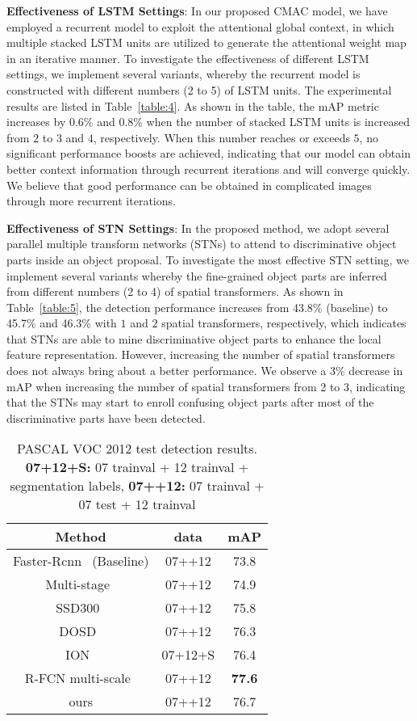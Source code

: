\documentclass[journal]{IEEEtran}
\begin{document}
\textbf{Effectiveness of LSTM Settings}: In our proposed CMAC model, we have employed a recurrent model to exploit the attentional global context, in which multiple stacked LSTM units are utilized to generate the attentional weight map in an iterative manner. To investigate the effectiveness of different LSTM settings, we implement several variants, whereby the recurrent model is constructed with different numbers (2 to 5) of LSTM units. The experimental results are listed in Table~\ref{table:4}. As shown in the table, the mAP metric increases by 0.6\% and 0.8\% when the number of stacked LSTM units is increased from $2$ to $3$ and $4$, respectively. When this number reaches or exceeds $5$, no significant performance boosts are achieved, indicating that our model can obtain better context information through recurrent iterations and will converge quickly. We believe that good performance can be obtained in complicated images through more recurrent iterations. 

\textbf{Effectiveness of STN Settings}: In the proposed method, we adopt several parallel multiple transform networks (STNs) to attend to discriminative object parts inside an object proposal. To investigate the most effective STN setting, we implement several variants whereby the fine-grained object parts are inferred from different numbers (2 to 4) of spatial transformers. As shown in Table~\ref{table:5}, the detection performance increases from 43.8\% (baseline) to 45.7\% and 46.3\% with $1$ and $2$ spatial transformers, respectively, which indicates that STNs are able to mine discriminative object parts to enhance the local feature representation. However, increasing the number of spatial transformers does not always bring about a better performance. We observe a 3\% decrease in mAP when increasing the number of spatial transformers from 2 to 3, indicating that the STNs may start to enroll confusing object parts after most of the discriminative parts have been detected.

\begin{table}[h] \centering
	\caption{\label{table:voc_2012}  PASCAL VOC 2012 test detection results. \textbf{07+12+S:} 07 trainval + 12 trainval + segmentation labels, \textbf{07++12:} 07
trainval + 07 test + 12 trainval}
	\begin{tabular}{c|c|c}
	\toprule
	\textbf{Method}&\textbf{data}&\textbf{mAP} \\
	\midrule
	Faster-Rcnn~\cite{ren2015faster} (Baseline) & 07++12  & 73.8 \\
	Multi-stage~\cite{li2017multi}     & 07++12  & 74.9 \\
	SSD300~\cite{liu2016ssd}                    & 07++12  & 75.8 \\
	DOSD~\cite{shen2017dsod}                    & 07++12  & 76.3 \\
	ION~\cite{bell2016inside}                   & 07+12+S & 76.4 \\
	R-FCN multi-scale~\cite{dai2016r}           & 07++12  & \textbf{77.6} \\  
	\midrule
	ours                   & 07++12  & 76.7 \\
	\bottomrule
	\end{tabular}
\end{table}
\end{document}
